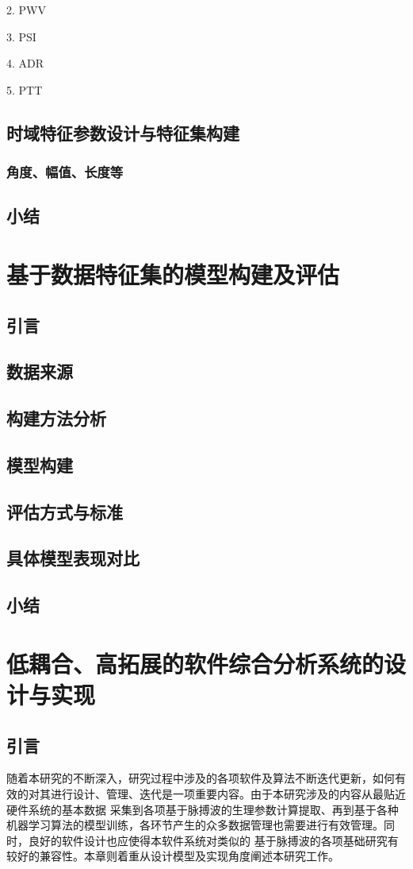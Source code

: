 2. PWV

3. PSI

4. ADR

5. PTT

\section{时域特征参数设计与特征集构建}
\subsection{角度、幅值、长度等}
\section{小结}

\chapter{基于数据特征集的模型构建及评估}
\section{引言}

\section{数据来源}
\section{构建方法分析}
\section{模型构建}
\section{评估方式与标准}
\section{具体模型表现对比}
\section{小结}

\chapter{低耦合、高拓展的软件综合分析系统的设计与实现}
\section{引言}
随着本研究的不断深入，研究过程中涉及的各项软件及算法不断迭代更新，如何有效的对其进行设计、管理、迭代是一项重要内容。由于本研究涉及的内容从最贴近硬件系统的基本数据
采集到各项基于脉搏波的生理参数计算提取、再到基于各种机器学习算法的模型训练，各环节产生的众多数据管理也需要进行有效管理。同时，良好的软件设计也应使得本软件系统对类似的
基于脉搏波的各项基础研究有较好的兼容性。本章则着重从设计模型及实现角度阐述本研究工作。
